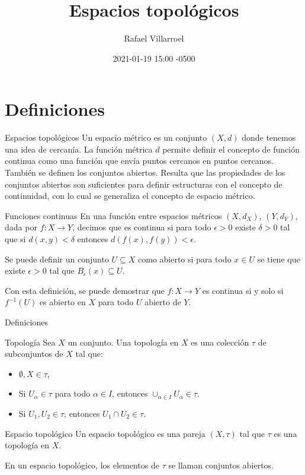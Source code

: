 \documentclass[spanish, presentation]{beamer}
\author{Rafael Villarroel}
\date{2021-01-19 15:00 -0500}
\title{Espacios topológicos}
\begin{document}
\maketitle
{}

\section{Definiciones}
\label{sec:org1ed84fc}
\begin{frame}[label={sec:org811c0cc}]{Espacios topológicos}
Un espacio métrico es un conjunto \((X,d)\) donde tenemos una idea de cercanía. La función métrica \(d\) permite definir el concepto de función continua como una función que envía puntos cercanos en puntos cercanos. También se definen los conjuntos abiertos. Resulta que las propiedades de los conjuntos abiertos son suficientes para definir estructuras con el concepto de continuidad, con lo cual se generaliza el concepto de espacio métrico.
\end{frame}

\begin{frame}[label={sec:orgcd034df}]{Funciones continuas}
En una función entre espacios métricos \((X,d_{X})\), \((Y,d_{Y})\), dada por \(f\colon X\to Y\), decimos que es \alert{continua} si para todo \(\epsilon>0\) existe \(\delta>0\) tal que si \(d(x,y)<\delta\) entonces \(d(f(x),f(y))<\epsilon\).

Se puede definir un conjunto \(U\subseteq X\) como \alert{abierto} si para todo \(x\in U\) se tiene que existe \(\epsilon>0\) tal que \(B_{\epsilon}(x)\subseteq U\).

Con esta definición, se puede demostrar que \(f\colon X\to Y\) es continua si y solo si \(f^{-1}(U)\) es abierto en \(X\) para todo \(U\) abierto de \(Y\).
\end{frame}

\begin{frame}[label={sec:orgac33309}]{Definiciones}
\begin{block}{Topología}
Sea \(X\) un conjunto. Una \alert{topología} en \(X\) es una colección \(\tau\) de subconjuntos de \(X\) tal que:
\begin{itemize}
\item \(\emptyset, X\in \tau\),
\item Si \(U_{\alpha}\in\tau\) para todo \(\alpha\in I\), entonces \(\cup_{\alpha\in I}U_{\alpha}\in\tau\).
\item Si \(U_{1},U_{2}\in\tau\), entonces \(U_{1}\cap U_{2}\in \tau\).
\end{itemize}
\end{block}
\begin{block}{Espacio topológico}
Un \alert{espacio topológico} es una pareja \((X,\tau)\) tal que \(\tau\) es una topología en \(X\).

En un espacio topológico, los elementos de \(\tau\) se llaman \alert{conjuntos abiertos.}
\end{block}
\end{frame}
\end{document}
